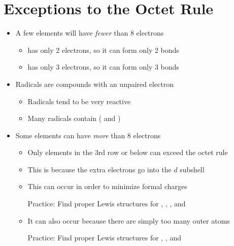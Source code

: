 \documentclass[12pt, openany, letterpaper]{memoir}
\begin{document}
\section{Exceptions to the Octet Rule}
\begin{itemize}
	\item A few elements will have \emph{fewer} than 8 electrons
	\begin{itemize}
		\item {} has only 2 electrons, so it can form only 2 bonds
		\item {} has only 3 electrons, so it can form only 3 bonds
	\end{itemize}
	\item Radicals are compounds with an unpaired electron
	\begin{itemize}
		\item Radicals tend to be very reactive
		\item Many radicals contain  ( and )
	\end{itemize}
	\item Some elements can have \emph{more} than 8 electrons
	\begin{itemize}
		\item Only elements in the 3rd row or below can exceed the octet rule
		\item This is because the extra electrons go into the $d$ subshell
		\item This can occur in order to minimize formal charges
		
		Practice: Find proper Lewis structures for , , , and 
		\item It can also occur because there are simply too many outer atoms
		
		Practice: Find proper Lewis structures for , , and 
	\end{itemize}
\end{itemize}
\end{document}
